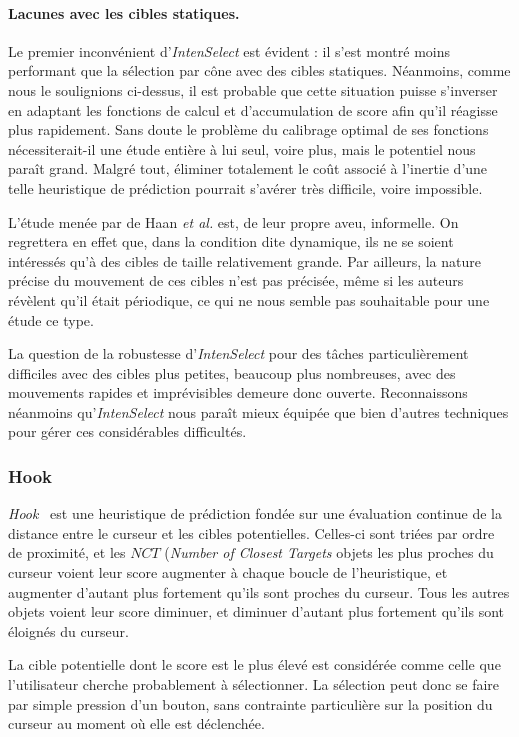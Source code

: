 	\paragraph{Lacunes avec les cibles statiques.}
	Le premier inconvénient d'\emph{IntenSelect} est évident : il s'est montré moins performant que la sélection par cône avec des cibles statiques. Néanmoins, comme nous le soulignions ci-dessus, il est probable que cette situation puisse s'inverser en adaptant les fonctions de calcul et d'accumulation de score afin qu'il réagisse plus rapidement. Sans doute le problème du calibrage optimal de ses fonctions nécessiterait-il une étude entière à lui seul, voire plus, mais le potentiel nous paraît grand. Malgré tout, éliminer totalement le coût associé à l'inertie d'une telle heuristique de prédiction pourrait s'avérer très difficile, voire impossible.
	
	L'étude menée par de Haan \emph{et al.} est, de leur propre aveu, informelle. On regrettera en effet que, dans la condition dite dynamique, ils ne se soient intéressés qu'à des cibles de taille relativement grande. Par ailleurs, la nature précise du mouvement de ces cibles n'est pas précisée, même si les auteurs révèlent qu'il était périodique, ce qui ne nous semble pas souhaitable pour une étude ce type.
	
	La question de la robustesse d'\emph{IntenSelect} pour des tâches particulièrement difficiles avec des cibles plus petites, beaucoup plus nombreuses, avec des mouvements rapides et imprévisibles demeure donc ouverte. Reconnaissons néanmoins qu'\emph{IntenSelect} nous paraît mieux équipée que bien d'autres techniques pour gérer ces considérables difficultés.
		
	\subsubsection{Hook}
	\emph{Hook}~\cite{ortega2013hook} est une heuristique de prédiction fondée sur une évaluation continue de la distance entre le curseur et les cibles potentielles. Celles-ci sont triées par ordre de proximité, et les $NCT$ (\emph{Number of Closest Targets} objets les plus proches du curseur voient leur score augmenter à chaque boucle de l'heuristique, et augmenter d'autant plus fortement qu'ils sont proches du curseur. Tous les autres objets voient leur score diminuer, et diminuer d'autant plus fortement qu'ils sont éloignés du curseur.
		
	La cible potentielle dont le score est le plus élevé est considérée comme celle que l'utilisateur cherche probablement à sélectionner. La sélection peut donc se faire par simple pression d'un bouton, sans contrainte particulière sur la position du curseur au moment où elle est déclenchée.

